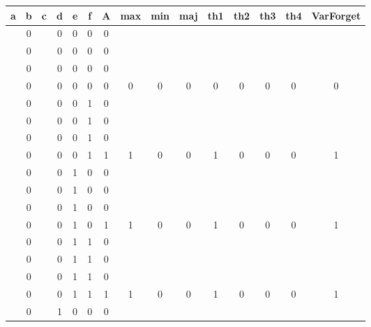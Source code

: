 \begin{table}[!tb]
    \centering
    \begin{tabular}{|c|c|c|c|c|c|c|c|c|c|c|c|c|c|c|}
        \hline
        \textbf{a} & \textbf{b} & \textbf{c} & \textbf{d} & \textbf{e} & \textbf{f} & \textbf{A} & \textbf{max} & \textbf{min} & \textbf{maj} & \textbf{th1} & \textbf{th2} & \textbf{th3} & \textbf{th4} & \textbf{VarForget} \\ \hline
        \rowcolor{gray!40}  & 0 &  & 0 & 0 & 0 & 0 &  &  &  &  &  &  &  &  \\ \hline
        \rowcolor{gray!40}  & 0 &  & 0 & 0 & 0 & 0 &  &  &  &  &  &  &  &  \\ \hline
        \rowcolor{gray!40}  & 0 &  & 0 & 0 & 0 & 0 &  &  &  &  &  &  &  &  \\ \hline
        \rowcolor{gray!40}  & 0 &  & 0 & 0 & 0 & 0 & 0 & 0 & 0 & 0 & 0 & 0 & 0 & 0 \\ \hline
        \rowcolor{blue!40}  & 0 &  & 0 & 0 & 1 & 0 &  &  &  &  &  &  &  &  \\ \hline
        \rowcolor{blue!40}  & 0 &  & 0 & 0 & 1 & 0 &  &  &  &  &  &  &  &  \\ \hline
        \rowcolor{blue!40}  & 0 &  & 0 & 0 & 1 & 0 &  &  &  &  &  &  &  &  \\ \hline
        \rowcolor{blue!40}  & 0 &  & 0 & 0 & 1 & 1 & 1 & 0 & 0 & 1 & 0 & 0 & 0 & 1 \\ \hline
        \rowcolor{red!40}  & 0 &  & 0 & 1 & 0 & 0 &  &  &  &  &  &  &  &  \\ \hline
        \rowcolor{red!40}  & 0 &  & 0 & 1 & 0 & 0 &  &  &  &  &  &  &  &  \\ \hline
        \rowcolor{red!40}  & 0 &  & 0 & 1 & 0 & 0 &  &  &  &  &  &  &  &  \\ \hline
        \rowcolor{red!40}  & 0 &  & 0 & 1 & 0 & 1 & 1 & 0 & 0 & 1 & 0 & 0 & 0 & 1 \\ \hline
        \rowcolor{green!40}  & 0 &  & 0 & 1 & 1 & 0 &  &  &  &  &  &  &  &  \\ \hline
        \rowcolor{green!40}  & 0 &  & 0 & 1 & 1 & 0 &  &  &  &  &  &  &  &  \\ \hline
        \rowcolor{green!40}  & 0 &  & 0 & 1 & 1 & 0 &  &  &  &  &  &  &  &  \\ \hline
        \rowcolor{green!40}  & 0 &  & 0 & 1 & 1 & 1 & 1 & 0 & 0 & 1 & 0 & 0 & 0 & 1 \\ \hline
        \rowcolor{yellow!40}  & 0 &  & 1 & 0 & 0 & 0 &  &  &  &  &  &  &  &  \\ \hline

\end{tabular}
\end{table}
